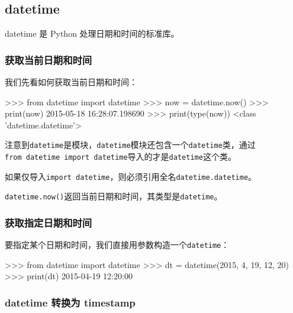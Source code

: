 \hypertarget{datetime}{%
\subsection{datetime}\label{datetime}}

datetime 是 Python 处理日期和时间的标准库。

\hypertarget{ux83b7ux53d6ux5f53ux524dux65e5ux671fux548cux65f6ux95f4}{%
\subsubsection{获取当前日期和时间}\label{ux83b7ux53d6ux5f53ux524dux65e5ux671fux548cux65f6ux95f4}}

我们先看如何获取当前日期和时间：

\begin{pythoncode}
>>> from datetime import datetime
>>> now = datetime.now() 
>>> print(now)
2015-05-18 16:28:07.198690
>>> print(type(now))
<class 'datetime.datetime'>
\end{pythoncode}

注意到\texttt{datetime}是模块，\texttt{datetime}模块还包含一个\texttt{datetime}类，通过\texttt{from\ datetime\ import\ datetime}导入的才是\texttt{datetime}这个类。

如果仅导入\texttt{import\ datetime}，则必须引用全名\texttt{datetime.datetime}。

\texttt{datetime.now()}返回当前日期和时间，其类型是\texttt{datetime}。

\hypertarget{ux83b7ux53d6ux6307ux5b9aux65e5ux671fux548cux65f6ux95f4}{%
\subsubsection{获取指定日期和时间}\label{ux83b7ux53d6ux6307ux5b9aux65e5ux671fux548cux65f6ux95f4}}

要指定某个日期和时间，我们直接用参数构造一个\texttt{datetime}：

\begin{pythoncode}
>>> from datetime import datetime
>>> dt = datetime(2015, 4, 19, 12, 20) 
>>> print(dt)
2015-04-19 12:20:00
\end{pythoncode}

\hypertarget{datetime-ux8f6cux6362ux4e3a-timestamp}{%
\subsubsection{datetime 转换为
timestamp}\label{datetime-ux8f6cux6362ux4e3a-timestamp}}


